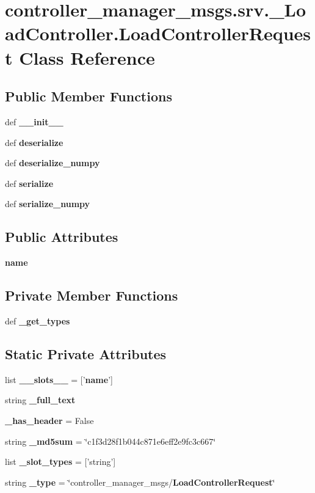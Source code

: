 \section{controller\-\_\-manager\-\_\-msgs.\-srv.\-\_\-\-Load\-Controller.\-Load\-Controller\-Request \-Class \-Reference}
\label{classcontroller__manager__msgs_1_1srv_1_1__LoadController_1_1LoadControllerRequest}
\subsection*{\-Public \-Member \-Functions}
\begin{DoxyCompactItemize}
\item 
def {\bf \-\_\-\-\_\-init\-\_\-\-\_\-}
\item 
def {\bf deserialize}
\item 
def {\bf deserialize\-\_\-numpy}
\item 
def {\bf serialize}
\item 
def {\bf serialize\-\_\-numpy}
\end{DoxyCompactItemize}
\subsection*{\-Public \-Attributes}
\begin{DoxyCompactItemize}
\item 
{\bf name}
\end{DoxyCompactItemize}
\subsection*{\-Private \-Member \-Functions}
\begin{DoxyCompactItemize}
\item 
def {\bf \-\_\-get\-\_\-types}
\end{DoxyCompactItemize}
\subsection*{\-Static \-Private \-Attributes}
\begin{DoxyCompactItemize}
\item 
list {\bf \-\_\-\-\_\-slots\-\_\-\-\_\-} = ['{\bf name}']
\item 
string {\bf \-\_\-full\-\_\-text}
\item 
{\bf \-\_\-has\-\_\-header} = \-False
\item 
string {\bf \-\_\-md5sum} = \char`\"{}c1f3d28f1b044c871e6eff2e9fc3c667\char`\"{}
\item 
list {\bf \-\_\-slot\-\_\-types} = ['string']
\item 
string {\bf \-\_\-type} = \char`\"{}controller\-\_\-manager\-\_\-msgs/{\bf \-Load\-Controller\-Request}\char`\"{}
\end{DoxyCompactItemize}


